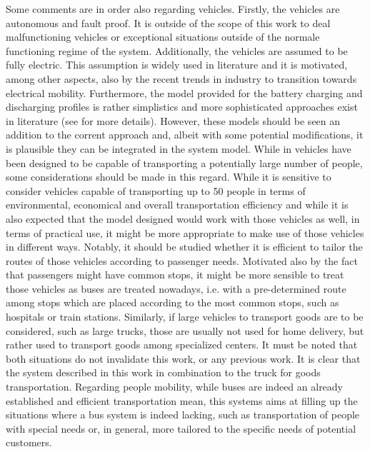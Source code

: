 Some comments are in order also regarding vehicles. Firstly, the vehicles are autonomous and fault proof. It is outside of the scope of this work to deal malfunctioning vehicles or exceptional situations outside of the normale functioning regime of the system. Additionally, the vehicles are assumed to be fully electric. This assumption is widely used in literature and it is motivated, among other aspects, also by the recent trends in industry to transition towards electrical mobility. Furthermore, the model provided for the battery charging and discharging profiles is rather simplistics and more sophisticated approaches exist in literature (see  for more details). However, these models should be seen an addition to the corrent approach and, albeit with some potential modifications, it is plausible they can be integrated in the system model. While in \cite{project_thesis} vehicles have been designed to be capable of transporting a potentially large number of people, some considerations should be made in this regard. While it is sensitive to consider vehicles capable of transporting up to 50 people in terms of environmental, economical and overall transportation efficiency and while it is also expected that the model designed would work with those vehicles as well, in terms of practical use, it might be more appropriate to make use of those vehicles in different ways. Notably, it should be studied whether it is efficient to tailor the routes of those vehicles according to passenger needs. Motivated also by the fact that passengers might have common stops, it might be more sensible to treat those vehicles as buses are treated nowadays, i.e. with a pre-determined route among stops which are placed according to the most common stops, such as hospitals or train stations. Similarly, if large vehicles to transport goods are to be considered, such as large trucks, those are usually not used for home delivery, but rather used to transport goods among specialized centers. It must be noted that both situations do not invalidate this work, or any previous work. It is clear that the system described in this work in combination to the truck for goods transportation. Regarding people mobility, while buses are indeed an already established and efficient transportation mean, this systems aims at filling up the situations where a bus system is indeed lacking, such as transportation of people with special needs or, in general, more tailored to the specific needs of potential customers. \\
